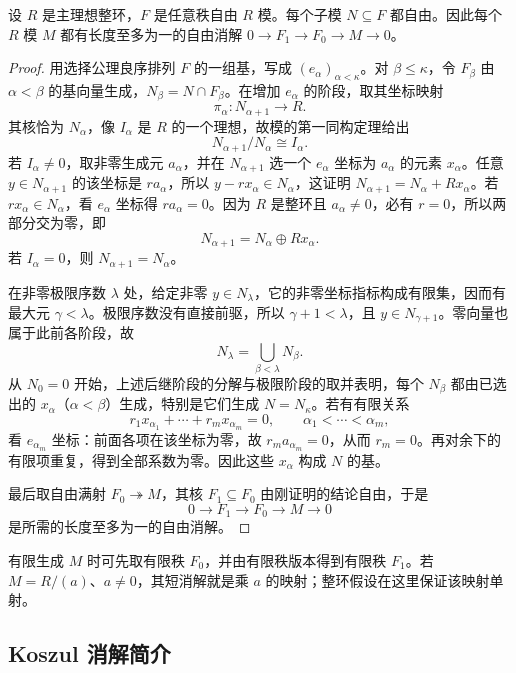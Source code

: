 \begin{theorem}\label{b4:thm:pid-free-submodule}
	设 \(R\) 是主理想整环，\(F\) 是任意秩自由 \(R\) 模。每个子模 \(N\subseteq F\) 都自由。因此每个 \(R\) 模 \(M\) 都有长度至多为一的自由消解 \(0\to F_1\to F_0\to M\to0\)。
\end{theorem}
\begin{proof}
	用选择公理良序排列 \(F\) 的一组基，写成 \((e_\alpha)_{\alpha<\kappa}\)。对 \(\beta\le\kappa\)，令 \(F_\beta\) 由 \(\alpha<\beta\) 的基向量生成，\(N_\beta=N\cap F_\beta\)。在增加 \(e_\alpha\) 的阶段，取其坐标映射
	\[
		\pi_\alpha:N_{\alpha+1}\longrightarrow R.
	\]
	其核恰为 \(N_\alpha\)，像 \(I_\alpha\) 是 \(R\) 的一个理想，故模的第一同构定理给出
	\[
		N_{\alpha+1}/N_\alpha\cong I_\alpha.
	\]
	若 \(I_\alpha\ne0\)，取非零生成元 \(a_\alpha\)，并在 \(N_{\alpha+1}\) 选一个 \(e_\alpha\) 坐标为 \(a_\alpha\) 的元素 \(x_\alpha\)。任意 \(y\in N_{\alpha+1}\) 的该坐标是 \(ra_\alpha\)，所以 \(y-rx_\alpha\in N_\alpha\)，这证明 \(N_{\alpha+1}=N_\alpha+Rx_\alpha\)。若 \(rx_\alpha\in N_\alpha\)，看 \(e_\alpha\) 坐标得 \(ra_\alpha=0\)。因为 \(R\) 是整环且 \(a_\alpha\ne0\)，必有 \(r=0\)，所以两部分交为零，即
	\[
		N_{\alpha+1}=N_\alpha\oplus Rx_\alpha.
	\]
	若 \(I_\alpha=0\)，则 \(N_{\alpha+1}=N_\alpha\)。

	在非零极限序数 \(\lambda\) 处，给定非零 \(y\in N_\lambda\)，它的非零坐标指标构成有限集，因而有最大元 \(\gamma<\lambda\)。极限序数没有直接前驱，所以 \(\gamma+1<\lambda\)，且 \(y\in N_{\gamma+1}\)。零向量也属于此前各阶段，故
	\[
		N_\lambda=\bigcup_{\beta<\lambda}N_\beta.
	\]
	从 \(N_0=0\) 开始，上述后继阶段的分解与极限阶段的取并表明，每个 \(N_\beta\) 都由已选出的 \(x_\alpha\)（\(\alpha<\beta\)）生成，特别是它们生成 \(N=N_\kappa\)。若有有限关系
	\[
		r_1x_{\alpha_1}+\cdots+r_mx_{\alpha_m}=0, \qquad \alpha_1<\cdots<\alpha_m,
	\]
	看 \(e_{\alpha_m}\) 坐标：前面各项在该坐标为零，故 \(r_ma_{\alpha_m}=0\)，从而 \(r_m=0\)。再对余下的有限项重复，得到全部系数为零。因此这些 \(x_\alpha\) 构成 \(N\) 的基。

	最后取自由满射 \(F_0\twoheadrightarrow M\)，其核 \(F_1\subseteq F_0\) 由刚证明的结论自由，于是
	\[
		0\longrightarrow F_1\longrightarrow F_0\longrightarrow M\longrightarrow0
	\]
	是所需的长度至多为一的自由消解。
\end{proof}

有限生成 \(M\) 时可先取有限秩 \(F_0\)，并由有限秩版本得到有限秩 \(F_1\)。若 \(M=R/(a)\)、\(a\ne0\)，其短消解就是乘 \(a\) 的映射；整环假设在这里保证该映射单射。

\subsection{Koszul 消解简介}
\label{b4:subsec:0704:02}

